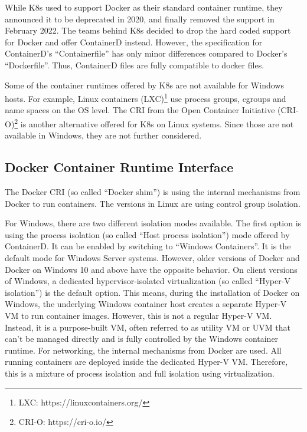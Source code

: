 While \ac{K8s} used to support Docker as their standard container runtime, they announced it to be deprecated in 2020, and finally removed the support in February 2022\cite{Kubernetes.2020, Kubernetes.2022}. The teams behind \ac{K8s} decided to drop the hard coded support for Docker and offer ContainerD instead.
However, the specification for ContainerD's \enquote{Containerfile} has only minor differences compared to Docker's \enquote{Dockerfile}. Thus, ContainerD files are fully compatible to docker files.

Some of the container runtimes offered by \ac{K8s} are not available for \ac{Windows} hosts. For example, Linux containers (LXC)\footnote{LXC: https://linuxcontainers.org/} use process groups, \acp{cgroup} and name spaces on the \ac{OS} level.
The \ac{CRI} from the Open Container Initiative (CRI-O)\footnote{CRI-O: https://cri-o.io/} is another alternative offered for \ac{K8s} on Linux systems. Since those are not available in \ac{Windows}, they are not further considered.


\subsection{Docker Container Runtime Interface}
The Docker \ac{CRI} (so called \enquote{Docker shim}) is using the internal mechanisms from Docker to run containers. The versions in Linux are using control group isolation.

For \ac{Windows}, there are two different isolation modes available. The first option is using the process isolation (so called \enquote{Host process isolation}) mode offered by ContainerD. It can be enabled by switching to \enquote{\ac{Windows} Containers}. It is the default mode for Windows Server systems.
However, older versions of Docker and Docker on Windows 10 and above have the opposite behavior\cite{RamosApolinario.2021}. On client versions of Windows, a dedicated hypervisor-isolated virtualization (so called \enquote{Hyper-V isolation}) is the default option\cite{RamosApolinario.2021}. This means, during the installation of Docker on \ac{Windows}, the underlying Windows container host creates a separate Hyper-V \ac{VM} to run container images. However, this is not a regular Hyper-V \ac{VM}\cite{RamosApolinario.2021}. Instead, it is a purpose-built \ac{VM}, often referred to as utility \ac{VM} or UVM that can't be managed directly and is fully controlled by the \ac{Windows} container runtime\cite{RamosApolinario.2021}. For networking, the internal mechanisms from Docker are used. All running containers are deployed inside the dedicated Hyper-V \ac{VM}. Therefore, this is a mixture of process isolation and full isolation using virtualization.

